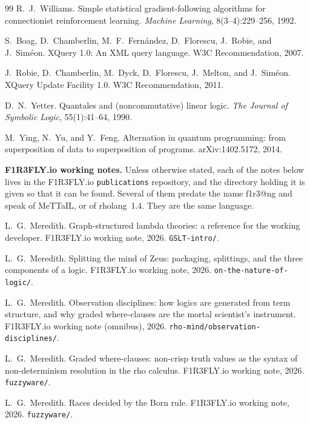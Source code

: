 \documentclass[11pt]{article}
\makeatletter
\theoremstyle{definition}
\theoremstyle{plain}
\theoremstyle{remark}
\newcommand{\flang}{\textsf{f1r3\textbar @ng}}
\makeatother
\begin{document}
\begin{thebibliography}{99}
R.~J.~Williams.
\newblock Simple statistical gradient-following algorithms for connectionist
reinforcement learning.
\newblock \emph{Machine Learning}, 8(3--4):229--256, 1992.

S.~Boag, D.~Chamberlin, M.~F.~Fern\'{a}ndez, D.~Florescu, J.~Robie, and
J.~Sim\'{e}on.
\newblock XQuery 1.0: An XML query language.
\newblock W3C Recommendation, 2007.

J.~Robie, D.~Chamberlin, M.~Dyck, D.~Florescu, J.~Melton, and J.~Sim\'{e}on.
\newblock XQuery Update Facility 1.0.
\newblock W3C Recommendation, 2011.

D.~N.~Yetter.
\newblock Quantales and (noncommutative) linear logic.
\newblock \emph{The Journal of Symbolic Logic}, 55(1):41--64, 1990.

M.~Ying, N.~Yu, and Y.~Feng.
\newblock Alternation in quantum programming: from superposition of data to
superposition of programs.
\newblock arXiv:1402.5172, 2014.

\bigskip
\noindent\textbf{F1R3FLY.io working notes.} Unless otherwise stated, each of
the notes below lives in the F1R3FLY.io \texttt{publications} repository, and
the directory holding it is given so that it can be found. Several of them
predate the name \flang{} and speak of MeTTaIL, or of rholang~1.4. They are the
same language.

L.~G.~Meredith.
\newblock Graph-structured lambda theories: a reference for the working
developer.
\newblock F1R3FLY.io working note, 2026. \texttt{GSLT-intro/}.

L.~G.~Meredith.
\newblock Splitting the mind of Zeus: packaging, splittings, and the three
components of a logic.
\newblock F1R3FLY.io working note, 2026. \texttt{on-the-nature-of-logic/}.

L.~G.~Meredith.
\newblock Observation disciplines: how logics are generated from term
structure, and why graded where-clauses are the mortal scientist's instrument.
\newblock F1R3FLY.io working note (omnibus), 2026.
\texttt{rho-mind/observation-disciplines/}.

L.~G.~Meredith.
\newblock Graded where-clauses: non-crisp truth values as the syntax of
non-determinism resolution in the rho calculus.
\newblock F1R3FLY.io working note, 2026. \texttt{fuzzyware/}.

L.~G.~Meredith.
\newblock Races decided by the Born rule.
\newblock F1R3FLY.io working note, 2026. \texttt{fuzzyware/}.


\end{thebibliography}
\end{document}
